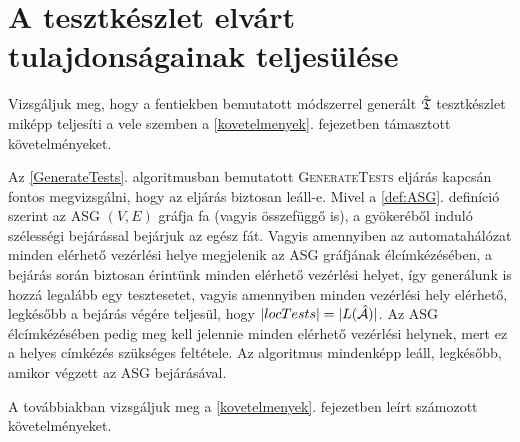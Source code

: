 \section{A tesztkészlet elvárt tulajdonságainak teljesülése} \label{kovetelmenyek-telj}

Vizsgáljuk meg, hogy a fentiekben bemutatott módszerrel generált $\hat{\mathfrak{T}}$ tesztkészlet miképp teljesíti a vele szemben a \ref{kovetelmenyek}. fejezetben támasztott követelményeket.

Az \ref{GenerateTests}. algoritmusban bemutatott \textsc{GenerateTests} eljárás kapcsán fontos megvizsgálni, hogy az eljárás biztosan leáll-e. Mivel a \ref{def:ASG}. definíció szerint az ASG $(V, E)$ gráfja fa (vagyis összefüggő is), a gyökeréből induló szélességi bejárással bejárjuk az egész fát. Vagyis amennyiben az automatahálózat minden elérhető vezérlési helye megjelenik az ASG gráfjának élcímkézésében, a bejárás során biztosan érintünk minden elérhető vezérlési helyet, így generálunk is hozzá legalább egy tesztesetet, vagyis amennyiben minden vezérlési hely elérhető, legkésőbb a bejárás végére teljesül, hogy $|locTests| = |L(\hat{\mathcal{A}})|$. Az ASG élcímkézésében pedig meg kell jelennie minden elérhető vezérlési helynek, mert ez a helyes címkézés szükséges feltétele. Az algoritmus mindenképp leáll, legkésőbb, amikor végzett az ASG bejárásával.

A továbbiakban vizsgáljuk meg a \ref{kovetelmenyek}. fejezetben leírt számozott követelményeket.

